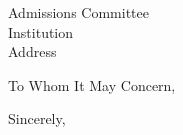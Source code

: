 \documentclass[12pt]{letter}
\begin{document}
\begin{letter}{Admissions Committee\\Institution\\Address}
\opening{To Whom It May Concern,}


\closing{Sincerely,}
\end{letter}
\end{document}
